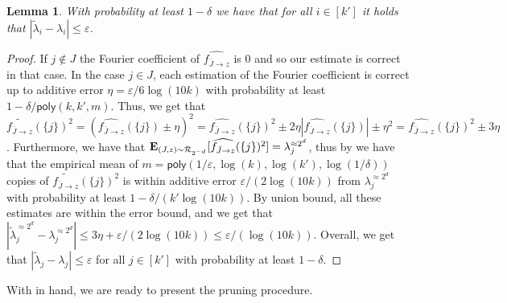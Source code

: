 \documentclass[10pt,a4paper]{article}
\providecommand{\poly}{\mathsf{poly}}
\theoremstyle{plain}
\newtheorem{lemma}[theorem]{Lemma}
\theoremstyle{remark}
\theoremstyle{plain}
\providecommand{\E}{}
\renewcommand{\E}{\mathop{\bf E\/}}
\newcommand{\eps}{\varepsilon}
\renewcommand{\hat}{\widehat}
\renewcommand{\tilde}{\widetilde}
\newcommand{\calR}{\mathcal{R}}
\newcommand{\Restrictedf}{f_{\bar{J}\to z}}
\begin{document}
\begin{lemma}
\label{lemma:lambda-i-correctness}
With probability at least $1-\delta$ we have that for all $i\in [k']$ it holds that 
$|\tilde{\lambda}_i -\lambda_i|\le \eps$.
\end{lemma}
\begin{proof}
If $j \notin J$ the Fourier coefficient of $\hat{\Restrictedf}$ is $0$ and so our estimate is correct in that case. In the case $j \in J$, each estimation of the Fourier coefficient is correct up to additive error $\eta = \eps/6 \log(10k)$ with probability at least $1-\delta/\poly(k,k',m)$.
Thus, we get that $\tilde{\Restrictedf}(\{j\})^2 = (\hat{\Restrictedf}(\{j\}) \pm \eta)^2 = \hat{\Restrictedf}(\{j\})^2  \pm 2\eta|\hat{\Restrictedf}(\{j\})| \pm \eta^2 = \hat{\Restrictedf}(\{j\})^2 \pm 3\eta$.
Furthermore, we have that $\E_{(J,z)\sim \calR_{2^{-d}}}[\hat{\Restrictedf}(\{j\})^2] = \lambda_j^{\approx 2^d}$, thus by  we have that the empirical mean of $m = \poly(1/\eps,\log(k), \log(k'), \log(1/\delta))$ copies of  $\tilde{\Restrictedf}(\{j\})^2$ is within additive error $\eps/(2 \log(10k))$ from $\lambda_j^{\approx 2^d}$ with probability at least  $1-\delta/(k' \log(10k))$. By union bound, all these estimates are within the error bound, and we get that $|\tilde{\lambda}_j^{\approx 2^d} - \lambda_j^{\approx 2^d}| \le 3\eta + \eps/(2 \log(10k)) \le \eps/(\log(10k))$. Overall, we get that $|\tilde{\lambda}_j - \lambda_j| \le \eps$ for all $j \in[k']$ with probability at least $1-\delta$.
\end{proof}



With  in hand, we are ready to present the pruning procedure.
\end{document}
